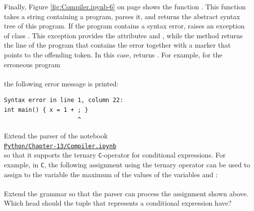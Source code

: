 \noindent
Finally, Figure \ref{fig:Compiler.ipynb-6} on page \pageref{fig:Compiler.ipynb-6} shows the function
.  This function takes a string containing a program, parses it, and returns the
abstract syntax tree of this program.  If the program contains a syntax error,  raises an exception
of class .  This exception provides the attributes  and , while the
method  returns the line of the program that contains the error together with a marker that
points to the offending token.  In this case,  returns .  For example, for the
erroneous program
\\[0.2cm]
\hspace*{1.3cm}
\\[0.2cm]
the following error message is printed:
\\[0.2cm]
\hspace*{1.3cm}
\begin{minipage}{0.8\linewidth}
\begin{verbatim}
Syntax error in line 1, column 22:
int main() { x = 1 + ; }
                     ^
\end{verbatim}
\end{minipage}

\exerciseEng
Extend the parser of the notebook
\\[0.2cm]
\hspace*{1.3cm}
\href{https://github.com/karlstroetmann/Formal-Languages/blob/master/Python/Chapter-13/Compiler.ipynb}{\texttt{Python/Chapter-13/Compiler.ipynb}}
\\[0.2cm]
so that it supports the ternary \texttt{C}-operator for conditional expressions.  For example, in \texttt{C},
the following assignment using the ternary operator can be used to assign to the variable 
the maximum of the values of the variables  and :
\\[0.2cm]
\hspace*{1.3cm}
\\[0.2cm]
Extend the grammar so that the parser can process the assignment shown above.  Which head should the tuple that
represents a conditional expression have? \eox

